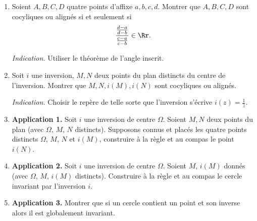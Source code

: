 \documentclass[11pt,class=report,crop=false]{standalone}
\newcommand{\inversion}{i}
\begin{document}
\begin{exercicecours}
\label{exo:inversion_cocyclicite}
\sauteligne
\begin{enumerate}
  \item Soient $A, B, C, D$ quatre points d'affixe $a,b,c,d$.
Montrer que $A, B, C, D$ sont cocyliques ou alignés si
et seulement si  
$$\frac{\frac{d-a}{d-b}}{\frac{c-a}{c-b}} \in \Rr.$$

\emph{Indication.} 
Utiliser le théorème de l'angle inscrit.

  \item Soit $\inversion$ une inversion, $M,N$ deux points du plan distincts du centre de l'inversion.
  Montrer que $M, N, \inversion(M), \inversion(N)$ sont cocyliques ou alignés.
  
\emph{Indication.} Choisir le repère de telle sorte que l'inversion s'écrive $\inversion(z)=  \frac{1}{\bar z}$.

  \item \textbf{Application 1.} Soit $\inversion$ une inversion de centre $\Omega$. Soient $M, N$ deux points du plan
  (avec $\Omega$, $M$, $N$ distincts).
  Supposons connus et placés les quatre points distincts $\Omega$, $M$, $N$ et $\inversion(M)$, construire à la règle et au compas le point $\inversion(N)$.
  
  \item \textbf{Application 2.} Soit $\inversion$ une inversion de centre $\Omega$. Soient $M$, $\inversion(M)$ donnés
    (avec $\Omega$, $M$, $\inversion(M)$ distincts). 
    Construire à la règle et au compas le cercle invariant par l'inversion $\inversion$.
    
  \item \textbf{Application 3.} Montrer que si un cercle contient un point et son inverse alors il est globalement invariant.
\end{enumerate}
\end{exercicecours}
\end{document}
